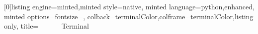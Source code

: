 [0]{listing engine=minted,minted style=native,
    minted language=python,enhanced,
    minted options={fontsize=\tiny},  
    colback=terminalColor,colframe=terminalColor,listing only, title= ~~~~~~Terminal
}
